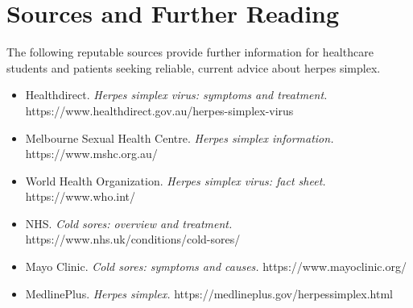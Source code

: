 \section*{Sources and Further Reading}
The following reputable sources provide further information for healthcare students and patients seeking reliable, current advice about herpes simplex.

\begin{itemize}
    \item Healthdirect. \textit{Herpes simplex virus: symptoms and treatment.} https://www.healthdirect.gov.au/herpes-simplex-virus
    \item Melbourne Sexual Health Centre. \textit{Herpes simplex information.} https://www.mshc.org.au/
    \item World Health Organization. \textit{Herpes simplex virus: fact sheet.} https://www.who.int/
    \item NHS. \textit{Cold sores: overview and treatment.} https://www.nhs.uk/conditions/cold-sores/
    \item Mayo Clinic. \textit{Cold sores: symptoms and causes.} https://www.mayoclinic.org/
    \item MedlinePlus. \textit{Herpes simplex.} https://medlineplus.gov/herpessimplex.html
\end{itemize}
